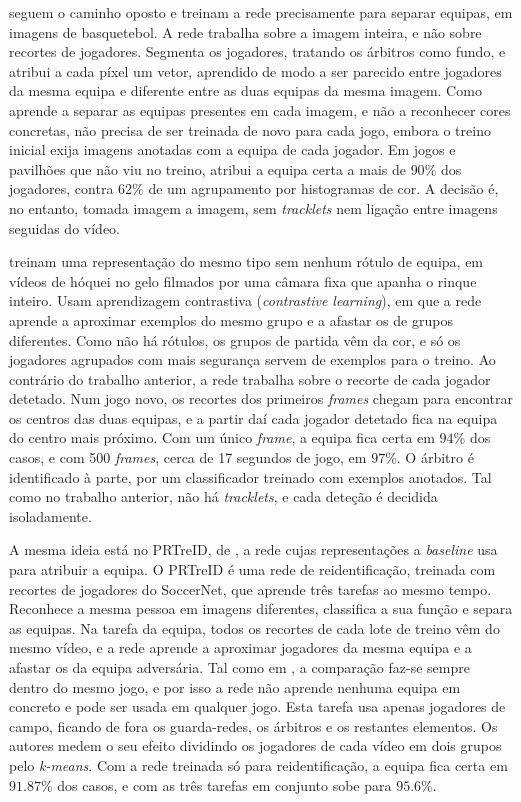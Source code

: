 \citet{istasse2019associative} seguem o caminho oposto e treinam a rede precisamente para separar equipas, em imagens de basquetebol. A rede trabalha sobre a imagem inteira, e não sobre recortes de jogadores. Segmenta os jogadores, tratando os árbitros como fundo, e atribui a cada píxel um vetor, aprendido de modo a ser parecido entre jogadores da mesma equipa e diferente entre as duas equipas da mesma imagem. Como aprende a separar as equipas presentes em cada imagem, e não a reconhecer cores concretas, não precisa de ser treinada de novo para cada jogo, embora o treino inicial exija imagens anotadas com a equipa de cada jogador. Em jogos e pavilhões que não viu no treino, atribui a equipa certa a mais de $90\%$ dos jogadores, contra $62\%$ de um agrupamento por histogramas de cor. A decisão é, no entanto, tomada imagem a imagem, sem \emph{tracklets} nem ligação entre imagens seguidas do vídeo.

\citet{koshkina2021contrastive} treinam uma representação do mesmo tipo sem nenhum rótulo de equipa, em vídeos de hóquei no gelo filmados por uma câmara fixa que apanha o rinque inteiro. Usam aprendizagem contrastiva (\emph{contrastive learning}), em que a rede aprende a aproximar exemplos do mesmo grupo e a afastar os de grupos diferentes. Como não há rótulos, os grupos de partida vêm da cor, e só os jogadores agrupados com mais segurança servem de exemplos para o treino. Ao contrário do trabalho anterior, a rede trabalha sobre o recorte de cada jogador detetado. Num jogo novo, os recortes dos primeiros \emph{frames} chegam para encontrar os centros das duas equipas, e a partir daí cada jogador detetado fica na equipa do centro mais próximo. Com um único \emph{frame}, a equipa fica certa em $94\%$ dos casos, e com 500 \emph{frames}, cerca de 17 segundos de jogo, em $97\%$. O árbitro é identificado à parte, por um classificador treinado com exemplos anotados. Tal como no trabalho anterior, não há \emph{tracklets}, e cada deteção é decidida isoladamente.

A mesma ideia está no PRTreID, de \citet{mansourian2023multitask}, a rede cujas representações a \emph{baseline} usa para atribuir a equipa. O PRTreID é uma rede de reidentificação, treinada com recortes de jogadores do SoccerNet, que aprende três tarefas ao mesmo tempo. Reconhece a mesma pessoa em imagens diferentes, classifica a sua função e separa as equipas. Na tarefa da equipa, todos os recortes de cada lote de treino vêm do mesmo vídeo, e a rede aprende a aproximar jogadores da mesma equipa e a afastar os da equipa adversária. Tal como em \citet{istasse2019associative}, a comparação faz-se sempre dentro do mesmo jogo, e por isso a rede não aprende nenhuma equipa em concreto e pode ser usada em qualquer jogo. Esta tarefa usa apenas jogadores de campo, ficando de fora os guarda-redes, os árbitros e os restantes elementos. Os autores medem o seu efeito dividindo os jogadores de cada vídeo em dois grupos pelo \emph{k-means}. Com a rede treinada só para reidentificação, a equipa fica certa em $91{.}87\%$ dos casos, e com as três tarefas em conjunto sobe para $95{.}6\%$.

